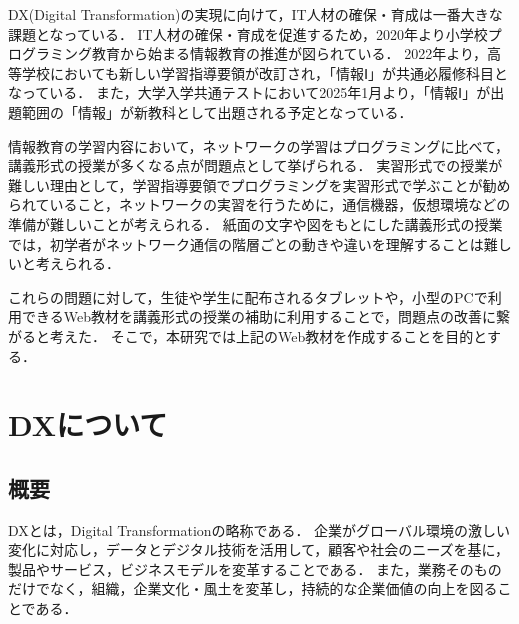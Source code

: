 \documentclass[12pt,a4j,titlepage]{ltjsarticle}
\begin{document}
DX(Digital Transformation)の実現に向けて，IT人材の確保・育成は一番大きな課題となっている．
IT人材の確保・育成を促進するため，2020年より小学校プログラミング教育から始まる情報教育の推進が図られている．
2022年より，高等学校においても新しい学習指導要領が改訂され，「情報Ⅰ」が共通必履修科目となっている．
また，大学入学共通テストにおいて2025年1月より，「情報Ⅰ」が出題範囲の「情報」が新教科として出題される予定となっている．

情報教育の学習内容において，ネットワークの学習はプログラミングに比べて，講義形式の授業が多くなる点が問題点として挙げられる．
実習形式での授業が難しい理由として，学習指導要領でプログラミングを実習形式で学ぶことが勧められていること，ネットワークの実習を行うために，通信機器，仮想環境などの準備が難しいことが考えられる．
紙面の文字や図をもとにした講義形式の授業では，初学者がネットワーク通信の階層ごとの動きや違いを理解することは難しいと考えられる．

これらの問題に対して，生徒や学生に配布されるタブレットや，小型のPCで利用できるWeb教材を講義形式の授業の補助に利用することで，問題点の改善に繋がると考えた．
そこで，本研究では上記のWeb教材を作成することを目的とする．
\clearpage

\section{DXについて}%
\subsection{概要}
DXとは，Digital Transformationの略称である．
企業がグローバル環境の激しい変化に対応し，データとデジタル技術を活用して，顧客や社会のニーズを基に，製品やサービス，ビジネスモデルを変革することである．
また，業務そのものだけでなく，組織，企業文化・風土を変革し，持続的な企業価値の向上を図ることである\cite{dx_gaiyou}． 
\end{document}
